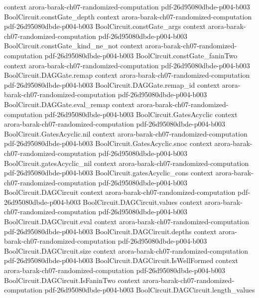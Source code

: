 \begin{theorem}
  {context}
  {arora-barak-ch07-randomized-computation}
  {pdf-26d95080dbde-p004-b003}
\proofstep
  {BoolCircuit.constGate_depth}
  {context}
  {arora-barak-ch07-randomized-computation}
  {pdf-26d95080dbde-p004-b003}
\proofstep
  {BoolCircuit.constGate_args}
  {context}
  {arora-barak-ch07-randomized-computation}
  {pdf-26d95080dbde-p004-b003}
\proofstep
  {BoolCircuit.constGate_kind_ne_not}
  {context}
  {arora-barak-ch07-randomized-computation}
  {pdf-26d95080dbde-p004-b003}
\proofstep
  {BoolCircuit.constGate_faninTwo}
  {context}
  {arora-barak-ch07-randomized-computation}
  {pdf-26d95080dbde-p004-b003}
\proofstep
  {BoolCircuit.DAGGate.remap}
  {context}
  {arora-barak-ch07-randomized-computation}
  {pdf-26d95080dbde-p004-b003}
\proofstep
  {BoolCircuit.DAGGate.remap_id}
  {context}
  {arora-barak-ch07-randomized-computation}
  {pdf-26d95080dbde-p004-b003}
\proofstep
  {BoolCircuit.DAGGate.eval_remap}
  {context}
  {arora-barak-ch07-randomized-computation}
  {pdf-26d95080dbde-p004-b003}
\proofstep
  {BoolCircuit.GatesAcyclic}
  {context}
  {arora-barak-ch07-randomized-computation}
  {pdf-26d95080dbde-p004-b003}
\proofstep
  {BoolCircuit.GatesAcyclic.nil}
  {context}
  {arora-barak-ch07-randomized-computation}
  {pdf-26d95080dbde-p004-b003}
\proofstep
  {BoolCircuit.GatesAcyclic.snoc}
  {context}
  {arora-barak-ch07-randomized-computation}
  {pdf-26d95080dbde-p004-b003}
\proofstep
  {BoolCircuit.gatesAcyclic_nil}
  {context}
  {arora-barak-ch07-randomized-computation}
  {pdf-26d95080dbde-p004-b003}
\proofstep
  {BoolCircuit.gatesAcyclic_cons}
  {context}
  {arora-barak-ch07-randomized-computation}
  {pdf-26d95080dbde-p004-b003}
\proofstep
  {BoolCircuit.DAGCircuit}
  {context}
  {arora-barak-ch07-randomized-computation}
  {pdf-26d95080dbde-p004-b003}
\proofstep
  {BoolCircuit.DAGCircuit.values}
  {context}
  {arora-barak-ch07-randomized-computation}
  {pdf-26d95080dbde-p004-b003}
\proofstep
  {BoolCircuit.DAGCircuit.eval}
  {context}
  {arora-barak-ch07-randomized-computation}
  {pdf-26d95080dbde-p004-b003}
\proofstep
  {BoolCircuit.DAGCircuit.depths}
  {context}
  {arora-barak-ch07-randomized-computation}
  {pdf-26d95080dbde-p004-b003}
\proofstep
  {BoolCircuit.DAGCircuit.size}
  {context}
  {arora-barak-ch07-randomized-computation}
  {pdf-26d95080dbde-p004-b003}
\proofstep
  {BoolCircuit.DAGCircuit.IsWellFormed}
  {context}
  {arora-barak-ch07-randomized-computation}
  {pdf-26d95080dbde-p004-b003}
\proofstep
  {BoolCircuit.DAGCircuit.IsFaninTwo}
  {context}
  {arora-barak-ch07-randomized-computation}
  {pdf-26d95080dbde-p004-b003}
\proofstep
  {BoolCircuit.DAGCircuit.length_values}

\end{theorem}
